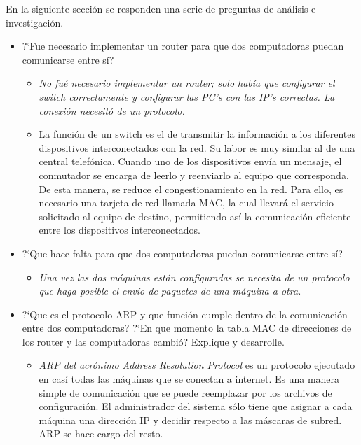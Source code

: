 {    En la siguiente secci\'on se responden una serie de preguntas de an\'alisis e investigaci\'on.

    \renewcommand{\labelitemi}{$\circ$}
    \begin{itemize}
        \item ?`Fue necesario implementar un router para que dos computadoras puedan comunicarse entre s\'i?
        \begin{itemize}
            \item[] \textit{No fu\'e necesario implementar un router; solo hab\'ia que configurar el switch correctamente y configurar las 
            PC's con las IP's correctas. La conexi\'on necesit\'o de un protocolo.}

            \item[] La funci\'on de un switch es el de transmitir la informaci\'on a los diferentes dispositivos interconectados con la red. 
            Su labor es muy similar al de una central telef\'onica. Cuando uno de los dispositivos env\'ia un mensaje, el conmutador se 
            encarga de leerlo y reenviarlo al equipo que corresponda. De esta manera, se reduce el congestionamiento en la red. 
            Para ello, es necesario una tarjeta de red llamada MAC, la cual llevar\'a el servicio solicitado al equipo de destino, 
            permitiendo as\'i la comunicaci\'on eficiente entre los dispositivos interconectados. \cite{ChTech}
        \end{itemize}
        
        \item ?`Que hace falta para que dos computadoras puedan comunicarse entre s\'i?
        \begin{itemize}
            \item[] \textit{Una vez las dos m\'aquinas est\'an configuradas se necesita de un protocolo que haga posible el env\'io de 
            paquetes de una m\'aquina a otra.}
        \end{itemize}
        
        \newpage
        \item ?`Que es el protocolo ARP y que funci\'on cumple dentro de la comunicaci\'on entre dos computadoras? 
        ?`En que momento la tabla MAC de direcciones de los router y las computadoras cambi\'o? Explique y desarrolle.
        \begin{itemize}
            \item[] \textit{ARP del acr\'onimo Address Resolution Protocol} es un protocolo ejecutado en cas\'i todas las m\'aquinas que
            se conectan a internet. Es una manera simple de comunicaci\'on que se puede reemplazar por los archivos de configuraci\'on.
            El administrador del sistema s\'olo tiene que asignar a cada m\'aquina una direcci\'on IP y decidir respecto a las m\'ascaras
            de subred. ARP se hace cargo del resto. \cite{Tanenbaum}
            

\end{itemize}
\end{itemize}}
